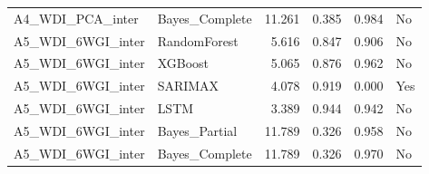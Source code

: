 \begin{table}
\begin{tabular}{llrrrl}
A4\_WDI\_PCA\_inter & Bayes\_Complete & 11.261 & 0.385 & 0.984 & No \\
A5\_WDI\_6WGI\_inter & RandomForest & 5.616 & 0.847 & 0.906 & No \\
A5\_WDI\_6WGI\_inter & XGBoost & 5.065 & 0.876 & 0.962 & No \\
A5\_WDI\_6WGI\_inter & SARIMAX & 4.078 & 0.919 & 0.000 & Yes \\
A5\_WDI\_6WGI\_inter & LSTM & 3.389 & 0.944 & 0.942 & No \\
A5\_WDI\_6WGI\_inter & Bayes\_Partial & 11.789 & 0.326 & 0.958 & No \\
A5\_WDI\_6WGI\_inter & Bayes\_Complete & 11.789 & 0.326 & 0.970 & No \\
\bottomrule
\end{tabular}
\end{table}
